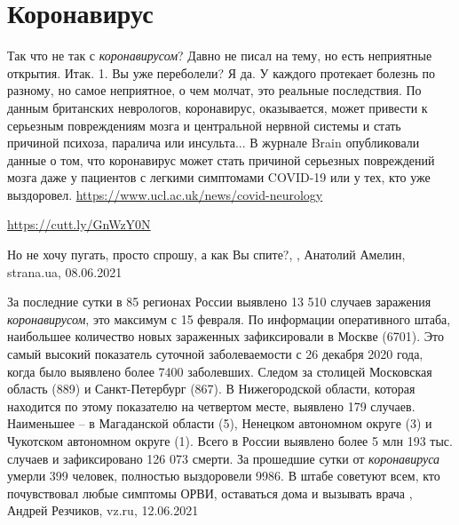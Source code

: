  
 
 
 
 
\chapter{Коронавирус}
\label{sec:slova.koronavirus}

Так что не так с \emph{коронавирусом}?  Давно не писал на тему, но есть
неприятные открытия. Итак. 1. Вы уже переболели? Я да.  У каждого протекает
болезнь по разному, но самое неприятное, о чем молчат, это реальные
последствия.  По данным британских неврологов, коронавирус, оказывается, может
привести к серьезным повреждениям мозга и центральной нервной системы и стать
причиной психоза, паралича или инсульта...  В журнале Brain опубликовали данные
о том, что коронавирус может стать причиной серьезных повреждений мозга даже у
пациентов с легкими симптомами COVID-19 или у тех, кто уже выздоровел.
\url{https://www.ucl.ac.uk/news/covid-neurology}\par
\url{https://cutt.ly/GnWzY0N}\par Но не хочу пугать, просто спрошу, а как Вы
спите?,
, Анатолий Амелин, strana.ua, 08.06.2021

За последние сутки в 85 регионах России выявлено 13 510 случаев заражения
\emph{коронавирусом}, это максимум с 15 февраля. По информации оперативного штаба,
наибольшее количество новых зараженных зафиксировали в Москве (6701). Это самый
высокий показатель суточной заболеваемости с 26 декабря 2020 года, когда было
выявлено более 7400 заболевших. Следом за столицей Московская область (889) и
Санкт-Петербург (867). В Нижегородской области, которая находится по этому
показателю на четвертом месте, выявлено 179 случаев. Наименьшее – в Магаданской
области (5), Ненецком автономном округе (3) и Чукотском автономном округе (1).
Всего в России выявлено более 5 млн 193 тыс. случаев и зафиксировано 126 073
смерти. За прошедшие сутки от \emph{коронавируса} умерли 399 человек, полностью
выздоровели 9986. В штабе советуют всем, кто почувствовал любые симптомы ОРВИ,
оставаться дома и вызывать врача
, Андрей Резчиков, vz.ru, 12.06.2021

